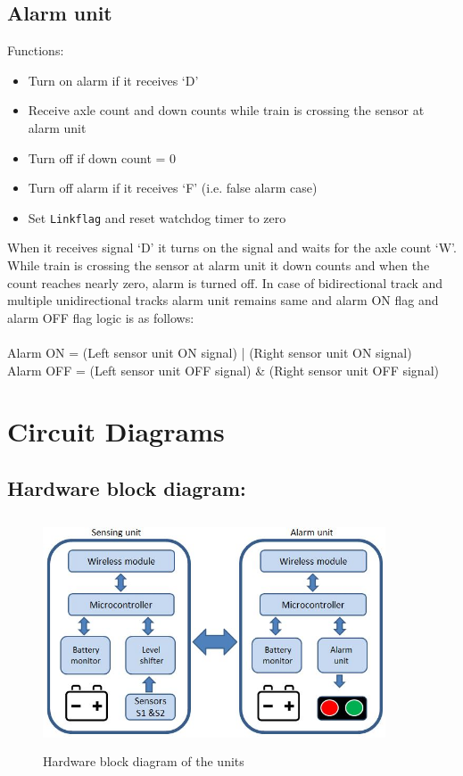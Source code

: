 \documentclass[aps,letterpaper,11pt]{article}
\begin{document}
\subsection{Alarm unit}
Functions:
\begin{itemize}
\item Turn on alarm if it receives `D'
\item Receive axle count and down counts while train is crossing the sensor at alarm unit
\item Turn off if down count = 0
\item Turn off alarm if it receives `F' (i.e. false alarm case)
\item Set \texttt{Linkflag} and reset watchdog timer to zero
\end{itemize}
When it receives signal `D' it turns on the signal and waits for the axle
count `W'. While train is crossing the sensor at alarm unit it down counts and
when the count reaches nearly zero, alarm is turned off.
In case of bidirectional track and multiple unidirectional tracks alarm unit
remains same and alarm ON flag and alarm OFF flag logic is as follows: \\ \\
Alarm ON = (Left sensor unit ON signal) | (Right sensor unit ON signal) \\
Alarm OFF = (Left sensor unit OFF signal) \& (Right sensor unit OFF signal) \\


\section{Circuit Diagrams}
\subsection{Hardware block diagram:}
\begin{figure}[H]
\begin{center}
\includegraphics[height = 2.7in,width=4in,angle=00]{figures/sensorAlarm.JPG}
\caption{\small Hardware block diagram of the units}
\end{center}
\end{figure}
\newpage
\end{document}
